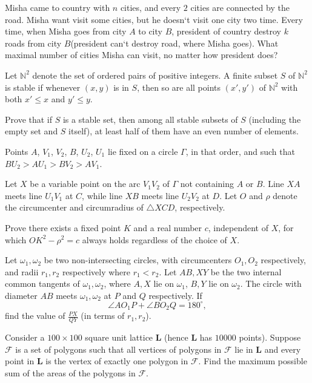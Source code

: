 \documentclass[11pt]{scrartcl}
\begin{document}
\begin{problem}[308215997593136]
Misha came to country with $n$ cities, and every $2$ cities are connected by the road. Misha want visit some cities, but he doesn`t visit one city two time. Every time, when Misha goes from city $A$ to city $B$, president of country destroy $k$ roads from city $B$(president can`t destroy road, where Misha goes). What maximal number of cities Misha can visit, no matter how president does?
\end{problem}
\begin{problem}[645930596871591]
Let $\mathbb{N}^2$ denote the set of ordered pairs of positive integers. A finite subset $S$ of $\mathbb{N}^2$ is stable if whenever $(x,y)$ is in $S$, then so are all points $(x',y')$ of $\mathbb{N}^2$ with both $x'\leq x$ and $y'\leq y$.

Prove that if $S$ is a stable set, then among all stable subsets of $S$ (including the empty set and $S$ itself), at least half of them have an even number of elements.
\end{problem}
\begin{problem}[315159980103862]
	Points $A$, $V_1$, $V_2$, $B$, $U_2$, $U_1$ lie fixed on a circle $\Gamma$, in that order, and such that $BU_2 > AU_1 > BV_2 > AV_1$.

Let $X$ be a variable point on the arc $V_1 V_2$ of $\Gamma$ not containing $A$ or $B$. Line $XA$ meets line $U_1 V_1$ at $C$, while line $XB$ meets line $U_2 V_2$ at $D$. Let $O$ and $\rho$ denote the circumcenter and circumradius of $\triangle XCD$, respectively.

Prove there exists a fixed point $K$ and a real number $c$, independent of $X$, for which $OK^2 - \rho^2 = c$ always holds regardless of the choice of $X$.
\end{problem}
\begin{problem}[689874125173032]
Let $\omega_1,\omega_2$ be two non-intersecting circles, with circumcenters $O_1,O_2$ respectively, and radii $r_1,r_2$ respectively where $r_1 < r_2$. Let $AB,XY$ be the two internal common tangents of $\omega_1,\omega_2$, where $A,X$ lie on $\omega_1$, $B,Y$ lie on $\omega_2$. The circle with diameter $AB$ meets $\omega_1,\omega_2$ at $P$ and $Q$ respectively. If$$\angle AO_1P+\angle BO_2Q=180^{\circ},$$find the value of $\frac{PX}{QY}$ (in terms of $r_1,r_2$).
\end{problem}
\begin{problem}[275429739915708]
Consider a $100\times 100$ square unit lattice $\textbf{L}$ (hence $\textbf{L}$ has $10000$ points). Suppose $\mathcal{F}$ is a set of polygons such that all vertices of polygons in $\mathcal{F}$ lie in $\textbf{L}$ and every point in $\textbf{L}$ is the vertex of exactly one polygon in $\mathcal{F}.$ Find the maximum possible sum of the areas of the polygons in $\mathcal{F}.$
\end{problem}
\end{document}
